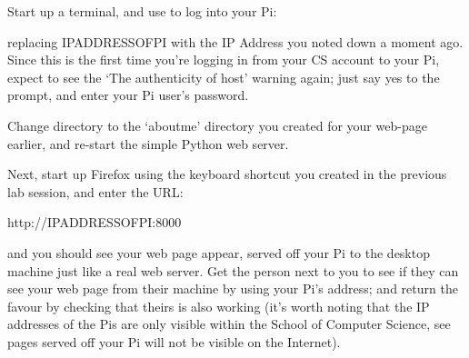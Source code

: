 Start up a terminal, and use  to log into your Pi:


replacing IPADDRESSOFPI with the IP Address you noted down a moment ago. Since this is the first time you're logging in from your CS account to your Pi, expect to see the `The authenticity of host' warning again; just say yes to the prompt, and enter your Pi user's password. 

Change directory to the `aboutme' directory you created for your web-page earlier, and re-start the simple Python web server. 

Next, start up Firefox using the keyboard shortcut you created in the previous lab session, and enter the URL:

\begin{ttoutenv}
http://IPADDRESSOFPI:8000
\end{ttoutenv}

and you should see your web page appear, served off your Pi to the desktop machine just like a real web server. Get the person next to you to see if they can see your web page from their machine by using your Pi's address; and return the favour by checking that theirs is also working (it's worth noting that the IP addresses of the Pis are only visible within the School of Computer Science, see pages served off your Pi will not be visible on the Internet).

